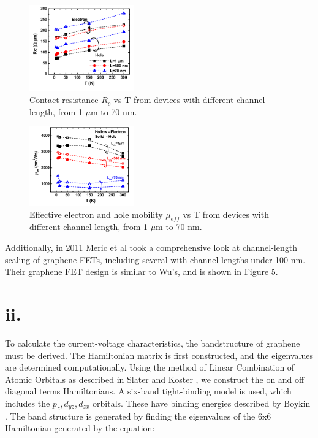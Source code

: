 \documentclass[11pt]{article}
\begin{document}
\begin{figure}[h!]
\centering 
\includegraphics[width=0.4\textwidth]{paper1_contactres.png}
\caption{Contact resistance $R_c$ vs T from devices with different channel length, from 1 $\mu$m to 70 nm.}\label{fig:FET}
\end{figure}

\begin{figure}[h!]
\centering 
\includegraphics[width=0.4\textwidth]{paper1_mobilitydata.png}
\caption{Effective electron and hole mobility $\mu_{eff}$ vs T from devices with different channel length, from 1 $\mu$m to 70 nm.}\label{fig:FET}
\end{figure}

Additionally, in 2011 Meric et al \cite{meric2011} took a comprehensive look at channel-length scaling of graphene FETs, including several with channel lengths under 100 nm. Their graphene FET design is similar to Wu's, and is shown in Figure 5.

\section*{ii.} To calculate the current-voltage characteristics, the bandstructure of graphene must be derived. The Hamiltonian matrix is first constructed, and the eigenvalues are determined computationally. Using the method of Linear Combination of Atomic Orbitals as described in Slater and Koster \cite{slaterkoster1954}, we construct the on and off diagonal terms Hamiltonians. A six-band tight-binding model is used, which includes the $p_z,d_{yz}, d_{zx}$ orbitals. These have binding energies described by Boykin \cite{boykin2011}. The band structure is generated by finding the eigenvalues of the 6x6 Hamiltonian generated by the equation:
\end{document}
